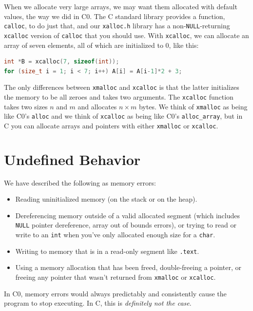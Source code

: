 When we allocate very large arrays, we may want them allocated with
default values, the way we did in C0. The C standard library provides a
function, \lstinline'calloc', to do just that, and our \lstinline'xalloc.h'
library has a non-\lstinline'NULL'-returning \lstinline'xcalloc' version of
\lstinline'calloc' that you should use. With \lstinline'xcalloc', we can allocate
an array of seven elements, all of which are initialized to 0, like this:
\begin{lstlisting}[language=c]
int *B = xcalloc(7, sizeof(int));
for (size_t i = 1; i < 7; i++) A[i] = A[i-1]*2 + 3;
\end{lstlisting}
The only differences between \lstinline'xmalloc' and \lstinline'xcalloc' is that
the latter initializes the memory to be all zeroes and takes two
arguments. The \lstinline'xcalloc' function takes two sizes $n$
and $m$ and allocates $n\times m$ bytes. We
think of \lstinline'xmalloc' as being like C0's \lstinline'alloc' and we think
of \lstinline'xcalloc' as being like C0's \lstinline'alloc_array', but in C you
can allocate arrays and pointers with either \lstinline'xmalloc' or
\lstinline'xcalloc'.


\section{Undefined Behavior}
\label{sec:mem:undefined_behavior}

We have described the following as memory errors:
\begin{itemize}
\item%
  Reading uninitialized memory (on the stack or on the heap).
\item%
  Dereferencing memory outside of a valid allocated segment (which includes
  \lstinline'NULL' pointer dereference, array out of bounds errors), or trying
  to read or write to an \lstinline'int' when you've only allocated enough
  size for a \lstinline'char'.
\item%
  Writing to memory that is in a read-only segment like \lstinline'.text'.
\item%
  Using a memory allocation that has been freed, double-freeing a pointer, or
  freeing any pointer that wasn't returned from \lstinline'xmalloc' or
  \lstinline'xcalloc'.
\end{itemize}
In C0, memory errors would always predictably and consistently cause
the program to stop executing. In C, this is \emph{definitely not the case}.

